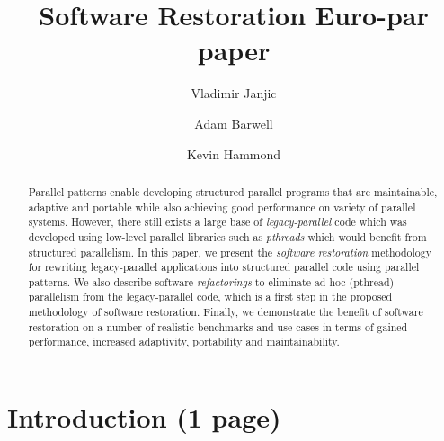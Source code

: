 \documentclass[runningheads]{llncs}
\begin{document}
\title{Software Restoration Euro-par paper}


\author{Vladimir Janjic \and Adam Barwell \and Kevin Hammond}


\maketitle


\begin{abstract}
    Parallel patterns enable developing structured parallel programs that are maintainable, adaptive and portable while also achieving good performance on variety of parallel systems. However, there still exists a large base of \emph{legacy-parallel} code which was developed using low-level parallel libraries such as \emph{pthreads} which would benefit from structured parallelism. In this paper, we present the \emph{software restoration} methodology for rewriting legacy-parallel applications into structured parallel code using parallel patterns. We also describe software \emph{refactorings} to eliminate ad-hoc (pthread) parallelism from the legacy-parallel code, which is a first step in the proposed methodology of software restoration. Finally, we demonstrate the benefit of software restoration on a number of realistic benchmarks and use-cases in terms of gained performance, increased adaptivity, portability and maintainability. 
\end{abstract}

\section{Introduction (1 page)}


\end{document}

